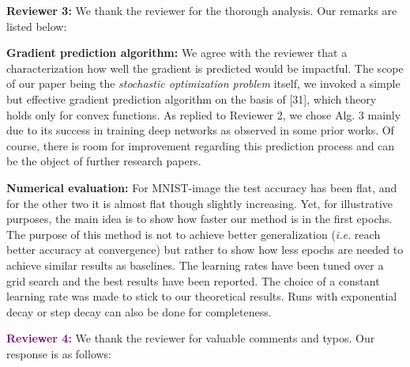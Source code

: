 \documentclass{article}
\begin{document}


\textbf{\textcolor{green!50!black}{Reviewer 3:}} We thank the reviewer for the thorough analysis. Our remarks are listed below:\vspace{-5pt}

\textbf{Gradient prediction algorithm:}
We agree with the reviewer that a characterization how well the gradient is predicted would be impactful.
The scope of our paper being the \emph{stochastic optimization problem} itself, we invoked a simple but effective gradient prediction algorithm on the basis of [31], which theory holds only for convex functions. 
As replied to Reviewer 2, we chose Alg. 3 mainly due to its success in training deep networks as observed in some prior works.
Of course, there is room for improvement regarding this prediction process and can be the object of further research papers.\vspace{-5pt}


\textbf{Numerical evaluation:}  For MNIST-image the test accuracy has been flat, and for the other two it is almost flat though slightly increasing.
Yet, for illustrative purposes, the main idea is to show how faster our method is in the first epochs.
The purpose of this method is not to achieve better generalization (\textit{i.e.} reach better accuracy at convergence) but rather to show how less epochs are needed to achieve similar results as baselines.
The learning rates have been tuned over a grid search and the best results have been reported. The choice of a constant learning rate was made to stick to our theoretical results.
Runs with exponential decay or step decay can also be done for completeness.\vspace{-5pt}


\textbf{\textcolor{purple}{Reviewer 4:}} We thank the reviewer for valuable comments and typos. Our response is as follows:\vspace{-5pt}
\end{document}
